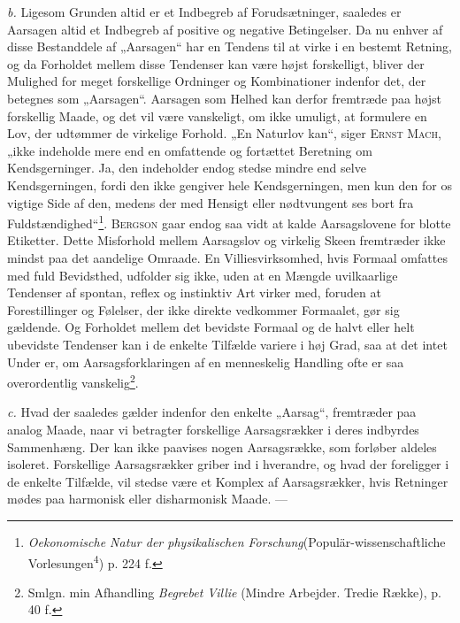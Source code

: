 \documentclass[12pt]{article}
\newcommand{\opage}[1]{\marginnote{\footnotesize\textit{[#1]}}}
\begin{document}
\textit{b.} Ligesom Grunden altid er et Indbegreb af Forudsætninger, saaledes er
Aarsagen altid et Indbegreb af positive og negative Betingelser. Da nu enhver af
disse Bestanddele af „Aarsagen“ har en Tendens til at virke i en bestemt
Retning, og da Forholdet mellem disse Tendenser kan være højst forskelligt,
bliver der Mulighed for meget forskellige Ordninger og Kombinationer indenfor
det, der betegnes som „Aarsagen“. Aarsagen som Helhed kan derfor fremtræde paa
højst forskellig Maade, og det vil være vanskeligt, om ikke umuligt, at
formulere en Lov, der udtømmer de virkelige Forhold. „En Naturlov kan“, siger
\textsc{Ernst Mach}, „ikke indeholde mere end en omfattende og fortættet
Beretning om Kendsgerninger. Ja, den indeholder endog stedse mindre end selve
Kendsgerningen, fordi den ikke gengiver hele Kendsgerningen, men kun den for os
vigtige Side af den, medens der med Hensigt eller nødtvungent ses bort fra
Fuldstændighed“\footnote{\textit{Oekonomische Natur der physikalischen
Forschung}(Populär-wissenschaftliche Vorlesungen\textsuperscript{4}) p. 224 f.}.
\textsc{Bergson} gaar endog saa vidt at kalde Aarsagslovene for blotte
Etiketter. Dette Misforhold mellem Aarsagslov og
\setcounter{footnote}{0}%
\opage{50}virkelig Skeen fremtræder ikke mindst paa det aandelige Omraade. En
Villiesvirksomhed, hvis Formaal omfattes med fuld Bevidsthed, udfolder sig ikke,
uden at en Mængde uvilkaarlige Tendenser af spontan, reflex og instinktiv Art
virker med, foruden at Forestillinger og Følelser, der ikke direkte vedkommer
Formaalet, gør sig gældende. Og Forholdet mellem det bevidste Formaal og de
halvt eller helt ubevidste Tendenser kan i de enkelte Tilfælde variere i høj
Grad, saa at det intet Under er, om Aarsagsforklaringen af en menneskelig
Handling ofte er saa overordentlig vanskelig\footnote{Smlgn. min Afhandling
\textit{Begrebet Villie} (Mindre Arbejder. Tredie Række), p. 40 f.}.

\textit{c.} Hvad der saaledes gælder indenfor den enkelte „Aarsag“, fremtræder
paa analog Maade, naar vi betragter forskellige Aarsagsrækker i deres indbyrdes
Sammenhæng. Der kan ikke paavises nogen Aarsagsrække, som forløber aldeles
isoleret. Forskellige Aarsagsrækker griber ind i hverandre, og hvad der
foreligger i de enkelte Tilfælde, vil stedse være et Komplex af Aarsagsrækker,
hvis Retninger mødes paa harmonisk eller disharmonisk Maade. ---
\end{document}
